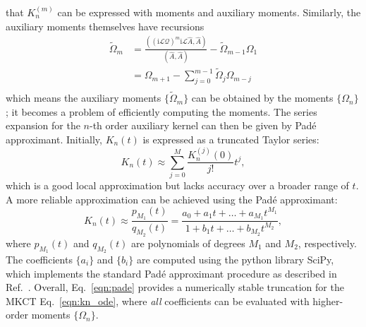 that $K_{n}^{(m)}$ can be expressed with moments and auxiliary moments. Similarly, the auxiliary moments themselves have recursions
\begin{equation}    
\begin{aligned}
    \tilde{\Omega}_m &= \frac{\left((\mathrm{i} \mathcal{L} \mathcal{Q})^{m} \mathrm{i} \mathcal{L} \hat{A}, \hat{A}\right)}{(\hat{A}, \hat{A})} - \tilde{\Omega}_{m-1} \Omega_1\\
    &= \Omega_{m+1} - \sum_{j=0}^{m-1} \tilde{\Omega}_j \Omega_{m-j} \\ 
\end{aligned}
\end{equation}
which means the auxiliary moments $\{\tilde{\Omega}_m\}$ can be obtained by the moments $\{\Omega_n\}$; it becomes a problem of efficiently computing the moments. The series expansion for the $n$-th order auxiliary kernel can then be given by Pad\'{e} approximant. Initially, $K_n(t)$ is expressed as a truncated Taylor series:
\begin{equation}
    K_n(t) \approx \sum_{j=0}^{M} \frac{K_n^{(j)}(0)}{j!} t^j,
\end{equation}
which is a good local approximation but lacks accuracy over a broader range of $t$. A more reliable approximation can be achieved using the Pad\'{e} approximant: 
\begin{equation}\label{eqn:pade}
    K_n(t) \approx \frac{p_{M_1}(t)}{q_{M_2}(t)} = \frac{a_0 + a_1 t + \dots + a_{M_1} t^{M_1}}{1 + b_1 t + \dots + b_{M_2} t^{M_2}},
\end{equation}
where $ p_{M_1}(t)$ and $q_{M_2}(t)$ are polynomials of degrees $M_1$ and $M_2$, respectively. The coefficients $\{a_i\}$ and $\{b_i\}$ are computed using the python library SciPy, which implements the standard Pad\'{e} approximant procedure as described in Ref.~\cite{Baker1996pade}. Overall, Eq.~\ref{eqn:pade} provides a numerically stable truncation for the MKCT Eq.~\ref{eqn:kn_ode}, where \emph{all} coefficients can be evaluated with higher-order moments $\{ \Omega_n \}$.
